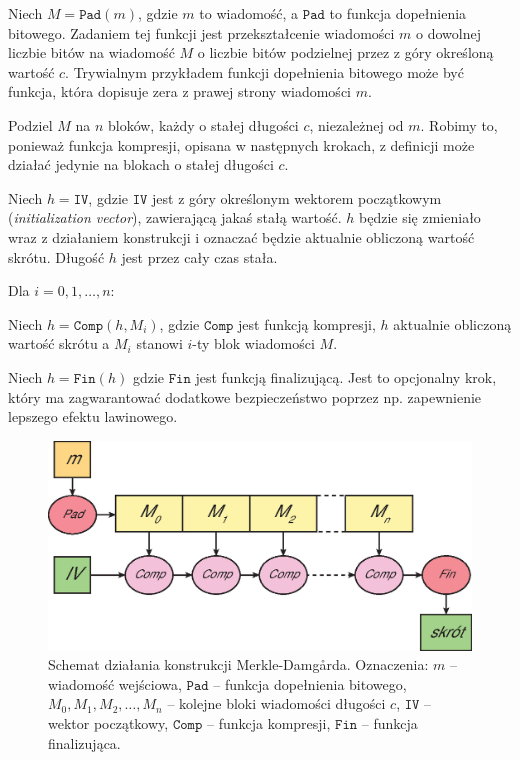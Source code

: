 \documentclass[12pt,a4paper,twoside]{article}
\begin{document}
\begin{myenumerate}
\item Niech $M = \mathtt{Pad}(m)$, gdzie $m$ to wiadomość, a $\mathtt{Pad}$ to
funkcja dopełnienia bitowego. Zadaniem tej funkcji jest przekształcenie
wiadomości $m$ o dowolnej liczbie bitów na wiadomość $M$ o liczbie bitów
podzielnej przez z góry określoną wartość $c$. Trywialnym przykładem funkcji
dopełnienia bitowego może być funkcja, która dopisuje zera z prawej strony
wiadomości $m$.

\item Podziel $M$ na $n$ bloków, każdy o stałej długości $c$, niezależnej od
$m$. Robimy to, ponieważ funkcja kompresji, opisana w następnych krokach, z
definicji może działać jedynie na blokach o stałej długości $c$.

\item Niech $h = \mathtt{IV}$, gdzie $\mathtt{IV}$ jest z góry określonym
wektorem początkowym (\textit{initialization vector}), zawierającą jakaś stałą
wartość. $h$ będzie się zmieniało wraz z działaniem konstrukcji i oznaczać
będzie aktualnie obliczoną wartość skrótu. Długość $h$ jest przez cały czas
stała.

\item Dla $i = 0, 1, \ldots, n$:

\begin{myenumerate}
\item Niech $h=\mathtt{Comp}(h,M_i)$, gdzie
$\mathtt{Comp}$ jest funkcją kompresji, $h$ aktualnie obliczoną wartość skrótu
a $M_i$ stanowi $i$-ty blok wiadomości $M$.
\end{myenumerate}

\item Niech $h=\mathtt{Fin}(h)$ gdzie $\mathtt{Fin}$ jest funkcją finalizującą.
Jest to opcjonalny krok, który ma zagwarantować dodatkowe bezpieczeństwo
poprzez np. zapewnienie lepszego efektu lawinowego.
\end{myenumerate}

\begin{figure}
\includegraphics[width=12cm]{img/merkle_damgard.eps}
\caption{Schemat działania konstrukcji Merkle-Damg\r{a}rda. Oznaczenia: $m$ --
wiadomość wejściowa, $\mathtt{Pad}$ -- funkcja dopełnienia bitowego, $M_0, M_1,
M_2, \ldots, M_n$ -- kolejne bloki wiadomości długości $c$, $\mathtt{IV}$ --
wektor początkowy, $\mathtt{Comp}$ -- funkcja kompresji,  $\mathtt{Fin}$ --
funkcja finalizująca.}
\label{fig:merkle_damgard}
\end{figure}
\end{document}
